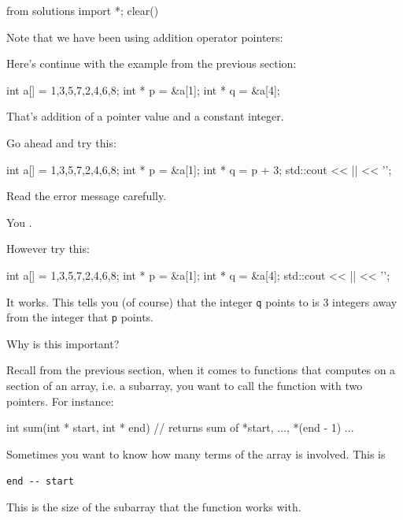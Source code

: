 \begin{python0}
from solutions import *; clear()
\end{python0}

Note that we have been using addition operator pointers:

Here's continue with the example from the previous section:

\begin{consolethree}[escapeinside=||]
int a[] = {1,3,5,7,2,4,6,8};
int * p = &a[1];
int * q = &a[4];
\end{consolethree}

That's addition of a pointer value and a constant integer.

Go ahead and try this:

\begin{consolethree}[escapeinside=||]
int a[] = {1,3,5,7,2,4,6,8};
int * p = &a[1];
int * q = p + 3;
std::cout << || << '\n';
\end{consolethree}

Read the error message carefully.

You .

However try this:

\begin{consolethree}[escapeinside=||]
int a[] = {1,3,5,7,2,4,6,8};
int * p = &a[1];
int * q = &a[4];
std::cout << || << '\n';
\end{consolethree}

It works. This tells you (of course) that the integer \texttt{q} points to is 3 integers away from the integer that \texttt{p} points.

Why is this important?

Recall from the previous section, when it comes to functions that computes on a section of an array, i.e. a subarray, you want to call the function with two pointers. For instance:

\begin{consolethree}[escapeinside=||]
int sum(int * start, int * end)
{
    // returns sum of *start, ..., *(end - 1)
    ...
}
\end{consolethree}

Sometimes you want to know how many terms of the array is involved. This
is

\verb!end -- start!

This is the size of the subarray that the function works with.

